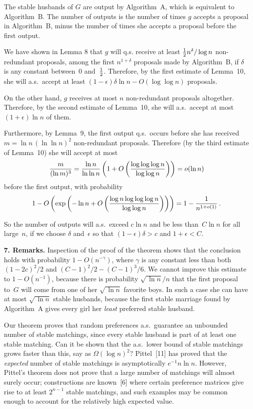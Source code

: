 \proof
The stable husbands of $G$ are output by Algorithm~A, which is equivalent
to Algorithm~B. The number of outputs is the number of times $g$ accepts
a proposal in Algorithm~B, minus the number of times she accepts a proposal
before the first output.

We have shown in Lemma 8 that $g$ will q.s. receive at least ${1\over 2}n^{\delta}/
\log n$ non-redundant proposals, among the first $n^{1+\delta}$ proposals made
by Algorithm~B, if $\delta$ is any constant between~0 and~${1\over 2}$. Therefore,
by the first estimate of Lemma~10, she will a.s.\ accept at least $(1-\epsilon)
\delta\ln n-O(\log\log n)$ proposals.

On the other hand, $g$ receives at most $n$ non-redundant proposals altogether.
Therefore, by the second estimate of Lemma~10, she will a.s.\ accept at most
$(1+\epsilon)\ln n$ of them.

Furthermore, by Lemma~9, the first output q.s.\ occurs before she has received
$m=\ln n\,(\ln\ln n)^2$ non-redundant proposals. Therefore (by the third estimate
of Lemma~10) she will accept at most
$${m\over(\ln m)^3}={\ln n\over \ln\ln n}\left(1+O\left({\log\log\log n\over
\log\log n}\right)\right)=o(\ln n)$$
before the first output, with probability
$$1-O\left(\exp\left(-\ln n+O\left({\log n\log\log\log n\over \log\log n}
\right)\right)\right)=1-{1\over n^{1+o(1)}}\,.$$

So the number of outputs will a.s.\ exceed $c\ln n$ 
and be less than~$C\ln n$
for all large~$n$, if we
choose $\delta$ and~$\epsilon$ so that $(1-\epsilon)\delta>c$ 
and $1+\epsilon <C$.
\quad\pfbox

\bigskip\noindent
{\bf 7. Remarks.}\enspace
Inspection of the proof of the theorem shows that the conclusion holds with
probability $1-O(n^{-\gamma})$, where $\gamma$ is any constant less than
both $(1-2c)^2\!/2$ and $(C-1)^2\!/2-(C-1)^3\!/6$.
We cannot improve this estimate to $1-O(n^{-1})$, because
there is probability $\sqrt{\,\ln n}/n$ that the first proposal to~$G$
will come from one of her $\sqrt{\,\ln n}$ favorite boys. In such a case
she can have at most $\sqrt{\,\ln n}$ stable husbands, because the first
 stable marriage found by Algorithm~A gives every girl her
{\it least\/} preferred stable husband.

Our theorem proves that random preferences a.s.\ guarantee an unbounded number
of stable matchings, since every stable husband is part of at least one
stable matching. Can it be shown that the a.s.\ lower bound of stable
matchings grows faster than this, say as $\Omega(\log n)^2$?
Pittel~[11]
has proved that the {\it expected\/} number of stable matchings is asymptotically
$e^{-1}n\ln n$. However, Pittel's theorem does not prove that a
large number of matchings will almost surely occur;
 constructions are known~[6]
where certain preference matrices give rise to at least $2^{n-1}$
 stable matchings, and such examples may be common enough to account
for the relatively high expected value.

